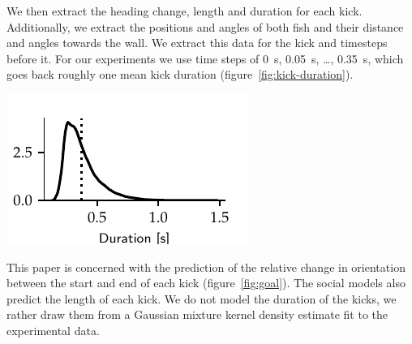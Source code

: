 \documentclass[nobib, a4paper]{tufte-handout}
\begin{document}
We then extract the heading change, length and duration for each kick.
Additionally, we extract the positions and angles of both fish and their distance and angles towards the wall.
We extract this data for the kick and timesteps before it.
For our experiments we use time steps of \SI{0}{\s}, \SI{0.05}{s}, \ldots, \SI{0.35}{\s}, which goes back roughly one mean kick duration (figure~\ref{fig:kick-duration}).
\begin{marginfigure}
\includegraphics{kick_duration}
\caption{Kernel density estimate of training kick duration.
Dotted line is the mean duration at \SI{0.37}{\s}.}
\label{fig:kick-duration}
\end{marginfigure}

This paper is concerned with the prediction of the relative change in orientation between the start and end of each kick (figure~\ref{fig:goal}).
The social models also predict the length of each kick.
We do not model the duration of the kicks, we rather draw them from a Gaussian mixture kernel density estimate fit to the experimental data.
\end{document}
